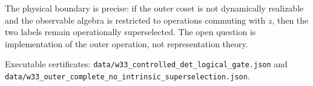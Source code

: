 The physical boundary is precise: if the outer coset is not dynamically
realizable and the observable algebra is restricted to operations commuting
with \(z\), then the two labels remain operationally superselected.  The open
question is implementation of the outer operation, not representation theory.

Executable certificates:
\texttt{data/w33\_controlled\_det\_logical\_gate.json} and
\texttt{data/w33\_outer\_complete\_no\_intrinsic\_superselection.json}.
